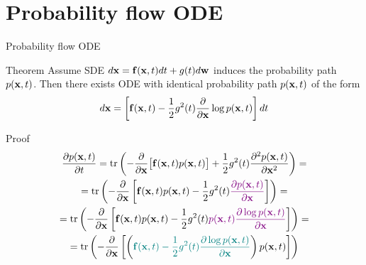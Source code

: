 \section{Probability flow ODE}
\begin{frame}{Probability flow ODE}
	\begin{block}{Theorem}
		Assume SDE $d\mathbf{x} = \mathbf{f}(\mathbf{x}, t) dt + g(t) d \mathbf{w}$ induces the probability path $p(\mathbf{x}, t)$.
		Then there exists ODE with identical probability path $p(\mathbf{x}, t)$ of the form
		\vspace{-0.3cm}
		\[
			d\mathbf{x} = \left[\mathbf{f}(\mathbf{x}, t) -\frac{1}{2} g^2(t) \frac{\partial}{\partial \mathbf{x}} \log p(\mathbf{x}, t) \right] dt
		\]
		\vspace{-0.7cm}
	\end{block}
	\begin{block}{Proof}
 		\vspace{-0.7cm}
 		{\small
 		\begin{multline*}
 			\frac{\partial p(\mathbf{x}, t)}{\partial t} = \text{tr}\left(- \frac{\partial}{\partial \mathbf{x}} \bigl[ \mathbf{f}(\mathbf{x}, t) p(\mathbf{x}, t)\bigr] + \frac{1}{2} g^2(t) \frac{\partial^2 p(\mathbf{x}, t)}{\partial \mathbf{x}^2} \right) = \\
 			=  \text{tr}\left(- \frac{\partial}{\partial \mathbf{x}} \left[ \mathbf{f}(\mathbf{x}, t) p(\mathbf{x}, t) - \frac{1}{2} g^2(t) {\color{violet}\frac{\partial p(\mathbf{x}, t)}{\partial \mathbf{x}}} \right]  \right) = \\
			 =  \text{tr}\left(- \frac{\partial}{\partial \mathbf{x}} \left[ \mathbf{f}(\mathbf{x}, t) p(\mathbf{x}, t) - \frac{1}{2} g^2(t) {\color{violet}p(\mathbf{x}, t) \frac{\partial \log p(\mathbf{x}, t)}{\partial \mathbf{x}}} \right]  \right)= \\
		  =  \text{tr}\left(- \frac{\partial}{\partial \mathbf{x}} \left[ \left( {\color{teal}\mathbf{f}(\mathbf{x}, t) - \frac{1}{2} g^2(t) \frac{\partial \log p(\mathbf{x}, t)}{\partial \mathbf{x}}}\right) p(\mathbf{x}, t) \right]  \right)
 		\end{multline*}
 		}
 	\end{block}
\end{frame}
